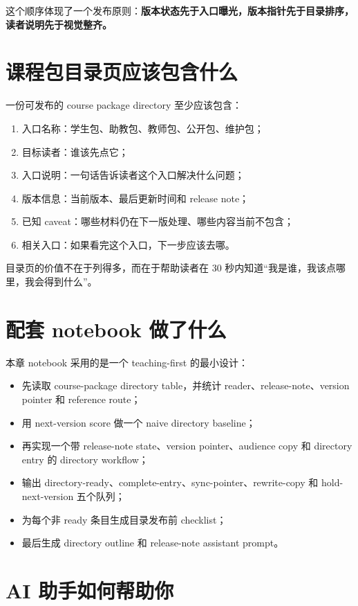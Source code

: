 这个顺序体现了一个发布原则：\textbf{版本状态先于入口曝光，版本指针先于目录排序，读者说明先于视觉整齐。}

\section{课程包目录页应该包含什么}

一份可发布的 course package directory 至少应该包含：

\begin{enumerate}
    \item 入口名称：学生包、助教包、教师包、公开包、维护包；
    \item 目标读者：谁该先点它；
    \item 入口说明：一句话告诉读者这个入口解决什么问题；
    \item 版本信息：当前版本、最后更新时间和 release note；
    \item 已知 caveat：哪些材料仍在下一版处理、哪些内容当前不包含；
    \item 相关入口：如果看完这个入口，下一步应该去哪。
\end{enumerate}

目录页的价值不在于列得多，而在于帮助读者在 30 秒内知道“我是谁，我该点哪里，我会得到什么”。

\section{配套 notebook 做了什么}

本章 notebook 采用的是一个 teaching-first 的最小设计：

\begin{itemize}
    \item 先读取 course-package directory table，并统计 reader、release-note、version pointer 和 reference route；
    \item 用 next-version score 做一个 naive directory baseline；
    \item 再实现一个带 release-note state、version pointer、audience copy 和 directory entry 的 directory workflow；
    \item 输出 directory-ready、complete-entry、sync-pointer、rewrite-copy 和 hold-next-version 五个队列；
    \item 为每个非 ready 条目生成目录发布前 checklist；
    \item 最后生成 directory outline 和 release-note assistant prompt。
\end{itemize}

\section{AI 助手如何帮助你}

